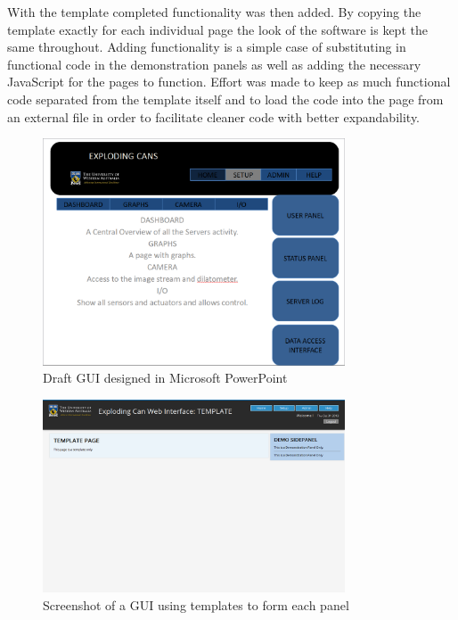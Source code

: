 	With the template completed functionality was then added.  By copying the template exactly for each individual page the look of the software is kept the same throughout.  Adding functionality is a simple case of substituting in functional code in the demonstration panels as well as adding the necessary JavaScript for the pages to function.  Effort was made to keep as much functional code separated from the template itself and to load the code into the page from an external file in order to facilitate cleaner code with better expandability.

\begin{figure}[H]
	\centering
	\includegraphics[width=0.8\textwidth]{figures/draftGUI.png}
	\caption{Draft GUI designed in Microsoft PowerPoint} 
	\label{draftGUI.png}
\end{figure}

\begin{figure}[H]
	\centering
	\includegraphics[width=0.8\textwidth]{figures/templateGUI.png}
	\caption{Screenshot of a GUI using templates to form each panel} 
	\label{templateGUI.png}
\end{figure}

